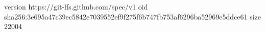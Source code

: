 version https://git-lfs.github.com/spec/v1
oid sha256:3e695a47c39ec5842e7039552ef9f275f6b747fb753af6296ba52969e5ddce61
size 22004
